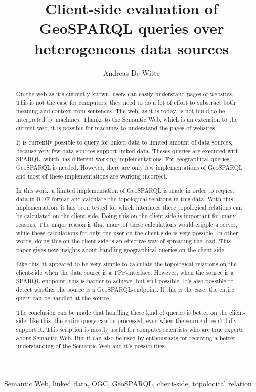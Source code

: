 \documentclass[twocolumn]{phdsymp} %
\begin{document}
\title{Client-side evaluation of GeoSPARQL queries over heterogeneous data sources} %

\author{Andreas De Witte}


\maketitle

\begin{abstract}
    On the web as it's currently known, users can easily understand pages of websites. This is not the case for computers, they need to do a lot of effort to substract both meaning and context from sentences. The web, as it is today, is not build to be interpreted by machines. Thanks to the Semantic Web, which is an extension to the current web, it is possible for machines to understand the pages of websites.

    It is currently possible to query for linked data to limited amount of data sources, because very few data sources support linked data. Theses queries are executed with SPARQL, which has different working implementations. For geographical queries, GeoSPARQL is needed. However, there are only few implementations of GeoSPARQL and most of these implementations are working incorrect.

    In this work, a limited implementation of GeoSPARQL is made in order to request data in RDF format and calculate the topological relations in this data. With this implementation, it has been tested for which interfaces these topological relations can be calculated on the client-side. Doing this on the client-side is important for many reasons. The major reason is that many of these calculations would cripple a server, while these calculations for only one user on the client-side is very possible. In other words, doing this on the client-side is an effective way of spreading the load. This paper gives new insights about handling geographical queries on the client-side.

    Like this, it appeared to be very simple to calculate the topological relations on the client-side when the data source is a TPF-interface. However, when the source is a SPARQL-endpoint, this is harder to achieve, but still possible. It's also possible to detect whether the source is a GeoSPARQL-endpoint. If this is the case, the entire query can be handled at the source.
    
    The conclusion can be made that handling these kind of queries is better on the client-side. like this, the entire query can be processed, even when the source doesn't fully support it. This scription is mostly useful for computer scientists who are true experts about Semantic Web. But it can also be used by enthousiasts for receiving a better understanding of the Semantic Web and it's possibilities.
\end{abstract}

\begin{keywords}
    Semantic Web, linked data, OGC, GeoSPARQL, client-side, topolocical relation
\end{keywords}
\end{document}
